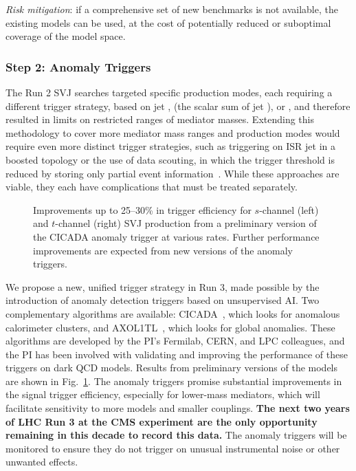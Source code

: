 \textit{Risk mitigation}: if a comprehensive set of new benchmarks is not available, the existing models can be used, at the cost of potentially reduced or suboptimal coverage of the model space.

\subsubsection{Step 2: Anomaly Triggers}\label{subsec:trig}

The Run 2 SVJ searches targeted specific production modes, each requiring a different trigger strategy, based on jet \pt, \HT (the scalar sum of jet \pt), or \ptmiss,
and therefore resulted in limits on restricted ranges of mediator masses.
Extending this methodology to cover more mediator mass ranges and production modes would require even more distinct trigger strategies,
such as triggering on ISR jet \pt in a boosted topology or the use of data scouting, in which the \HT trigger threshold is reduced by storing only partial event information~\cite{Mukherjee:2019anz}.
While these approaches are viable, they each have complications that must be treated separately.

\begin{figure}[htb!]
\centering
{}
\caption{Improvements up to 25--30\% in trigger efficiency for $s$-channel (left) and $t$-channel (right) SVJ production
from a preliminary version of the CICADA anomaly trigger at various rates.
Further performance improvements are expected from new versions of the anomaly triggers.}
\label{fig:svjanomaly}
\end{figure}

We propose a new, unified trigger strategy in Run 3, made possible by the introduction of anomaly detection triggers based on unsupervised AI.
Two complementary algorithms are available: CICADA~\cite{CMS-DP-2023-086}, which looks for anomalous calorimeter clusters, and AXOL1TL~\cite{CMS-DP-2023-079}, which looks for global anomalies.
These algorithms are developed by the PI's Fermilab, CERN, and LPC colleagues, and the PI has been involved with validating and improving the performance of these triggers on dark QCD models.
Results from preliminary versions of the models are shown in Fig.~\ref{fig:svjanomaly}.
The anomaly triggers promise substantial improvements in the signal trigger efficiency, especially for lower-mass mediators,
which will facilitate sensitivity to more models and smaller couplings.
\textbf{The next two years of LHC Run 3 at the CMS experiment are the only opportunity remaining in this decade to record this data.}
The anomaly triggers will be monitored to ensure they do not trigger on unusual instrumental noise or other unwanted effects.

